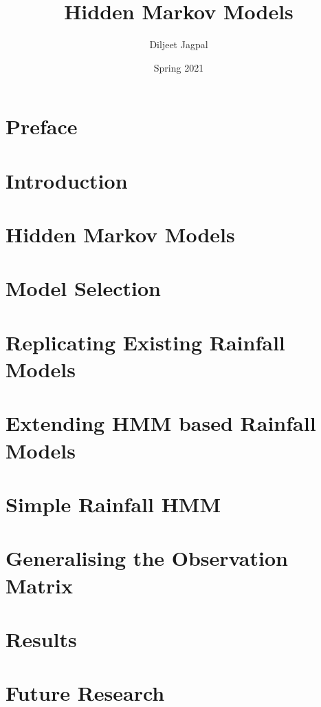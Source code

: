 \documentclass[a4paper,12pt]{report}
\title{\Huge Hidden Markov Models}
\author{Diljeet Jagpal}
\date{Spring 2021}
\theoremstyle{plain}
\begin{document}
    \maketitle

    \chapter*{Preface}
    \label{Abstract}
    

	\tableofcontents

	\newpage

	\chapter{Introduction}
    \label{Introduction}
	
	\newpage

	\chapter{Hidden Markov Models}
	\label{Hidden_Markov}
	
	\newpage

	\chapter{Model Selection}
    \label{Model_Selection}
	
	\newpage

	\chapter{Replicating Existing Rainfall Models}
	\label{Replicating_Existing_Rainfall_Model}
    
	\newpage

	\chapter{Extending HMM based Rainfall Models}
	\label{Extending_HMM_Based_Rainfall_Models}
    
	\newpage

	\chapter{Simple Rainfall HMM}
	\label{Simple_Rainfall_HMM}
    
	\newpage

	\chapter{Generalising the Observation Matrix}
	\label{Generalising_the_Observation_Matrix}
    
	\newpage

	\chapter{Results}
    \label{Results}
	
	\newpage

	\chapter{Future Research}
	\label{Future_Research}
    
	\newpage

	\nocite{*}
	\printbibliography
\end{document}
